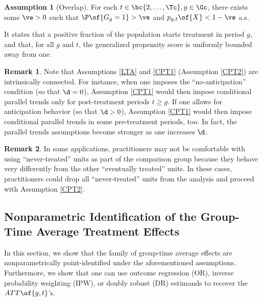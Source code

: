 \documentclass[12pt]{article}
\newcommand{\CiteReference}{../Notes/reference.bib}
\theoremstyle{definition}
\newtheorem{assumption}{Assumption}
\newtheorem{remark}{Remark}
\begin{document}
\begin{assumption}[Overlap]
    For each $t \in \bc{2, \ldots, \Tc}, g \in \Gc$, there exists some $\ve > 0$ such that $\P\of{G_g = 1} > \ve$ and $p_{g,t}\of{X} < 1 - \ve$ a.s.
\end{assumption}
It states that a positive fraction of the population starts treatment in period $g$, and that, for all $g$ and $t$, the generalized propensity score is uniformly bounded away from one.

\begin{remark}
    Note that Assumptions \ref{LTA} and \ref{CPT1} (Assumption \ref{CPT2}) are intrinsically connected. For instance, when one imposes the ``no-anticipation'' condition (so that $\d = 0$), Assumption \ref{CPT1} would then impose conditional parallel trends only for post-treatment periods $t \geq g$. If one allows for anticipation behavior (so that $\d > 0$), Assumption \ref{CPT1} would then impose conditional parallel trends in some pre-treatment periods, too. In fact, the parallel trends assumptions become stronger as one increases $\d$.
\end{remark}

\begin{remark}
    In some applications, practitioners may not be comfortable with using ``never-treated'' units as part of the comparison group because they behave very differently from the other ``eventually treated'' units. In these cases, practitioners could drop all ``never-treated'' units from the analysis and proceed with Assumption \ref{CPT2}.
\end{remark}

\subsection{Nonparametric Identification of the Group-Time Average Treatment Effects}

In this section, we show that the family of group-time average effects are nonparametrically point-identified under the aforementioned assumptions. Furthermore, we show that one can use outcome regression (OR), inverse probability weighting (IPW), or doubly robust (DR) estimands to recover the $ATT\of{g,t}$'s.



\end{document}
